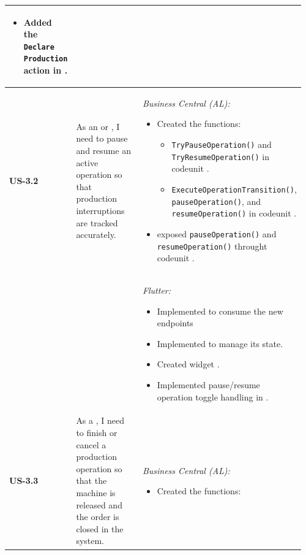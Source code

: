 \begin{longtable}{@{} P{0.09\linewidth} P{0.38\linewidth} P{0.49\linewidth} @{}}
\begin{itemize}[noitemsep, topsep=0pt, partopsep=0pt, leftmargin=*]
		\item Added the \texttt{Declare Production} action in .
	\end{itemize}\\
	\midrule
	\textbf{US-3.2}
	& As an  or , I need to pause and
	resume an active operation so that production interruptions are tracked
	accurately.
	& \noindent\textit{Business Central (AL):}
	\begin{itemize}[noitemsep, topsep=0pt, partopsep=0pt, leftmargin=*]
		\item Created the functions:
		\begin{itemize}[noitemsep, topsep=0pt, partopsep=0pt, leftmargin=*] 
			\item \texttt{TryPauseOperation()} and \texttt{TryResumeOperation()} in codeunit .
			\item \texttt{ExecuteOperationTransition()}, \texttt{pauseOperation()}, and \texttt{resumeOperation()} in codeunit . 
		\end{itemize}
		\item exposed \texttt{pauseOperation()} and \texttt{resumeOperation()} throught codeunit .
	\end{itemize}
	\\ & &
	\noindent\textit{Flutter:}
	\begin{itemize}[noitemsep, topsep=0pt, partopsep=0pt, leftmargin=*]
		\item Implemented  to consume the new endpoints 
		\item Implemented  to manage its state.
		\item Created widget .
		\item Implemented pause/resume operation toggle handling in .
	\end{itemize} \\
	\midrule
	\textbf{US-3.3}
	& As a , I need to finish or cancel a production
	operation so that the machine is released and the order is closed in the
	system.
	& \noindent\textit{Business Central (AL):}
	\begin{itemize}[noitemsep, topsep=0pt, partopsep=0pt, leftmargin=*]
		\item Created the functions:
		\begin{itemize}[noitemsep, topsep=0pt, partopsep=0pt, leftmargin=*]

\end{itemize}
\end{itemize}
\end{longtable}
